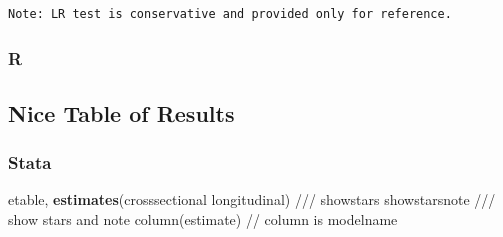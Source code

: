 \documentclass[
  letterpaper,
  DIV=11,
  numbers=noendperiod]{scrreprt}
\newenvironment{Shaded}{\begin{snugshade}}{\end{snugshade}}
\newcommand{\CommentTok}[1]{\textcolor[rgb]{0.37,0.37,0.37}{#1}}
\newcommand{\KeywordTok}[1]{\textcolor[rgb]{0.00,0.23,0.31}{\textbf{#1}}}
\newcommand{\NormalTok}[1]{\textcolor[rgb]{0.00,0.23,0.31}{#1}}
\begin{document}
\begin{verbatim}
Note: LR test is conservative and provided only for reference.
\end{verbatim}

\subsubsection{R}

\subsection{Nice Table of Results}\label{nice-table-of-results}

\subsubsection{Stata}

\begin{Shaded}
\begin{Highlighting}[]

\NormalTok{etable, }\KeywordTok{estimates}\NormalTok{(crosssectional longitudinal) }\CommentTok{///}
\NormalTok{showstars showstarsnote }\CommentTok{/// show stars and note}
\NormalTok{column(estimate) }\CommentTok{// column is modelname}
\end{Highlighting}
\end{Shaded}
\end{document}
